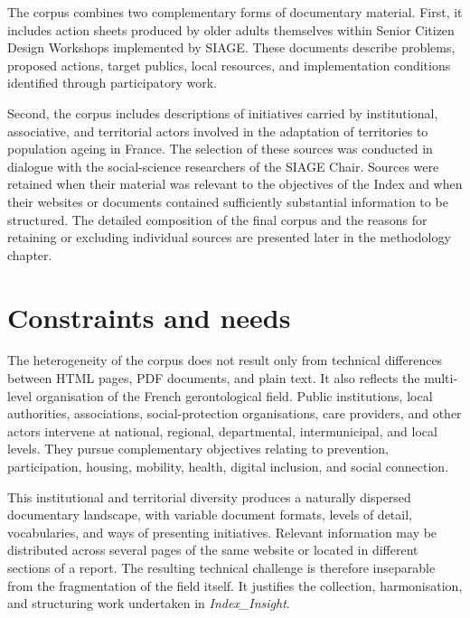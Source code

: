 The corpus combines two complementary forms of documentary material. First, it
includes action sheets produced by older adults themselves within Senior Citizen
Design Workshops implemented by SIAGE. These documents describe problems,
proposed actions, target publics, local resources, and implementation conditions
identified through participatory work.

Second, the corpus includes descriptions of initiatives carried by institutional,
associative, and territorial actors involved in the adaptation of territories to
population ageing in France. The selection of these sources was conducted in
dialogue with the social-science researchers of the SIAGE Chair. Sources were
retained when their material was relevant to the objectives of the Index and when
their websites or documents contained sufficiently substantial information to be
structured. The detailed composition of the final corpus and the reasons for
retaining or excluding individual sources are presented later in the methodology
chapter.

\section{Constraints and needs}

The heterogeneity of the corpus does not result only from technical differences
between HTML pages, PDF documents, and plain text. It also reflects the
multi-level organisation of the French gerontological field. Public institutions,
local authorities, associations, social-protection organisations, care providers,
and other actors intervene at national, regional, departmental, intermunicipal, and
local levels. They pursue complementary objectives relating to prevention,
participation, housing, mobility, health, digital inclusion, and social connection.

This institutional and territorial diversity produces a naturally dispersed
documentary landscape, with variable document formats, levels of detail,
vocabularies, and ways of presenting initiatives. Relevant information may be
distributed across several pages of the same website or located in different
sections of a report. The resulting technical challenge is therefore inseparable
from the fragmentation of the field itself. It justifies the collection,
harmonisation, and structuring work undertaken in \textit{Index\_Insight}.
